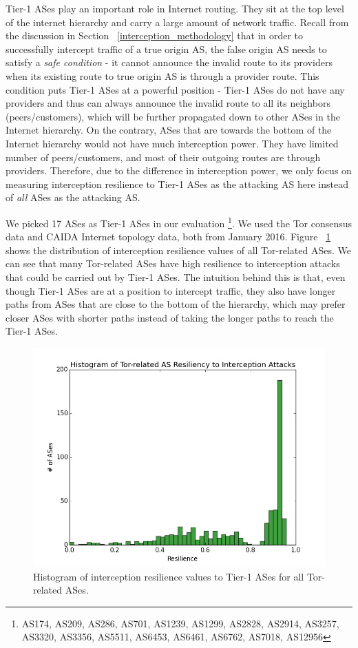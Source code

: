 Tier-1 ASes play an important role in Internet routing. They sit at the top level of the internet hierarchy and carry a large amount of network traffic. Recall from the discussion in Section ~\ref{interception_methodology} that in order to successfully intercept traffic of a true origin AS, the false origin AS needs to satisfy a \emph{safe condition} - it cannot announce the invalid route to its providers when its existing route to true origin AS is through a provider route. This condition puts Tier-1 ASes at a powerful position - Tier-1 ASes do not have any providers and thus can always announce the invalid route to all its neighbors (peers/customers), which will be further propagated down to other ASes in the Internet hierarchy. On the contrary, ASes that are towards the bottom of the Internet hierarchy would not have much interception power. They have limited number of peers/customers, and most of their outgoing routes are through providers. Therefore, due to the difference in interception power, we only focus on measuring interception resilience to Tier-1 ASes as the attacking AS here instead of \emph{all} ASes as the attacking AS. 

We picked 17 ASes as Tier-1 ASes in our evaluation \footnote{AS174, AS209, AS286, AS701, AS1239, AS1299, AS2828, AS2914, AS3257, AS3320, AS3356, AS5511, AS6453, AS6461, AS6762, AS7018, AS12956}. We used the Tor consensus data and CAIDA Internet topology data, both from January 2016. Figure ~\ref{fig:interception_histogram} shows the distribution of interception resilience values of all Tor-related ASes. We can see that many Tor-related ASes have high resilience to interception attacks that could be carried out by Tier-1 ASes. The intuition behind this is that, even though Tier-1 ASes are at a position to intercept traffic, they also have longer paths from ASes that are close to the bottom of the hierarchy, which may prefer closer ASes with shorter paths instead of taking the longer paths to reach the Tier-1 ASes. 

\begin{figure}[ht!]
\centering
\includegraphics[width=.4\textwidth]{figure/interception_resiliency}
\caption{Histogram of interception resilience values to Tier-1 ASes for all Tor-related ASes.}
\label{fig:interception_histogram}
\end{figure}

